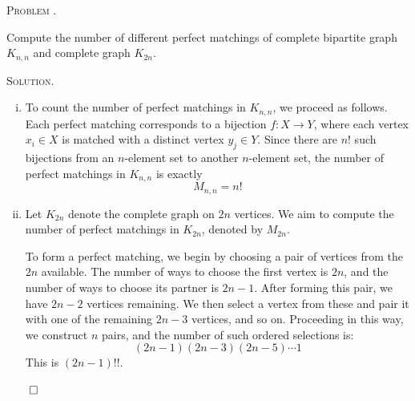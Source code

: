 \documentclass[12pt, a4paper, oneside]{ctexart}
\newcounter{problemname}
\newenvironment{problem}{\begin{framed}\stepcounter{problemname}\par\noindent\textsc{Problem \arabic{problemname}. }}{\end{framed}\par}
\newenvironment{solution}{%
	\par\noindent\textsc{Solution. }\ignorespaces
}{%
	\hfill$\qed$\par
}
\begin{document}
	
	
	
	\begin{problem}
	
		 Compute the number of different perfect matchings of complete bipartite graph $K_{n,n}$ and complete graph $K_{2n}$.
		
		
	\end{problem}
	
	\begin{solution}
		\begin{enumerate}[(i)]
			\item 			
			To count the number of perfect matchings in \( K_{n,n} \), we proceed as follows. Each perfect matching corresponds to a bijection \( f: X \to Y \), where each vertex \( x_i \in X \) is matched with a distinct vertex \( y_j \in Y \). Since there are \( n! \) such bijections from an \( n \)-element set to another \( n \)-element set, the number of perfect matchings in \( K_{n,n} \) is exactly
			\[
			M_{n,n} = n!
			\]
			
			\item Let $K_{2n}$ denote the complete graph on $2n$ vertices. We aim to compute the number of perfect matchings in $K_{2n}$, denoted by $M_{2n}$.
			
			To form a perfect matching, we begin by choosing a pair of vertices from the $2n$ available. The number of ways to choose the first vertex is $2n$, and the number of ways to choose its partner is $2n - 1$. After forming this pair, we have $2n - 2$ vertices remaining. We then select a vertex from these and pair it with one of the remaining $2n - 3$ vertices, and so on. Proceeding in this way, we construct $n$ pairs, and the number of such ordered selections is:
			\[
			(2n - 1)(2n - 3)(2n - 5)\cdots 1
			\]
			This is $(2n-1)!!$.
			
			
		\end{enumerate}
		
		
	\end{solution}
	
	
	
\end{document}
